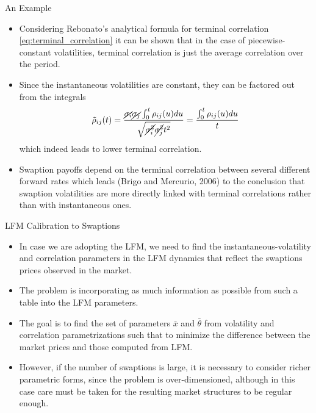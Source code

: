\documentclass{beamer}
\begin{document}
\begin{frame}{An Example}
\begin{itemize}
	\item<1-> Considering Rebonato's analytical formula for terminal correlation \cref{eq:terminal_correlation} it can be shown that in the case of piecewise-constant volatilities, terminal correlation is just the average correlation over the period. 
  	\item<2-> Since the instantaneous volatilities are constant, they can be factored out from the integrals
	  \begin{equation*}	    \tilde{\rho}_{ij}(t)=\frac{\cancel{\sigma_i}\cancel{\sigma_j}\int_0^t\rho_{ij}(u)du}{\sqrt{\cancel{\sigma_i^2}\cancel{\sigma_j^2} t^2}}= \frac{\int_0^t\rho_{ij}(u)du}{t}		
  	\end{equation*}
  	which indeed leads to lower terminal correlation.
  	\item<3-> Swaption payoffs depend on the terminal correlation between several different forward rates which leads (Brigo and Mercurio, 2006) to the conclusion that swaption volatilities are more directly linked with terminal correlations rather than with instantaneous ones.
  \end{itemize}
\end{frame}

\begin{frame}{LFM Calibration to Swaptions}
\begin{itemize}
\item<1-> In case we are adopting the LFM, we need to find the instantaneous-volatility and correlation parameters in the LFM dynamics that reflect the swaptions prices observed in the market.

\item<2-> The problem is incorporating as much information as possible from such a table into the LFM parameters. 
\item<3-> The goal is to find the set of parameters $\bar{x}$ and $\bar{\theta}$ from volatility and correlation parametrizations such that to minimize the difference between the market prices and those computed from LFM.
\item<4-> However, if the number of swaptions is large, it is necessary to consider richer parametric forms, since the problem is over-dimensioned, although in this case care must be taken for the resulting market structures to be regular enough.
\end{itemize}
\end{frame}
\end{document}
